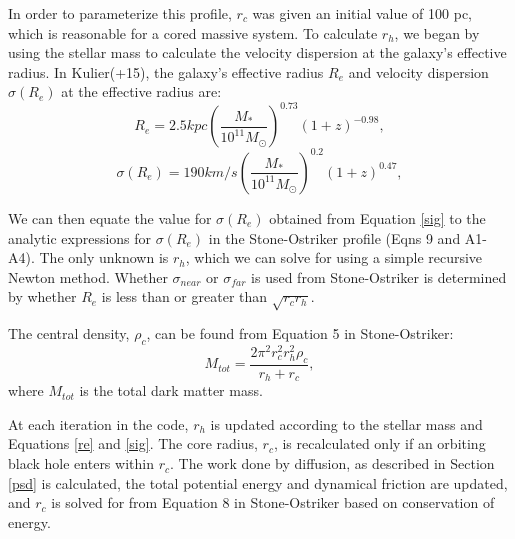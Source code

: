 \documentclass[english, backref,breaklinks,colorlinks,citecolor=blue, usenatbib]{mnras}
\begin{document}
In order to parameterize this profile, $r_c$ was given an initial value of 100 pc, which is reasonable for a cored massive system.  To calculate $r_h$, we began by using the stellar mass to calculate the velocity dispersion at the galaxy's effective radius.  In Kulier(+15), the galaxy's effective radius $R_{e}$ and velocity dispersion $\sigma(R_e)$ at the effective radius are:
\begin{equation} \label{re}
R_{e} = 2.5 kpc\left(\frac{M_*}{10^{11}M_{\odot}}\right)^{0.73}(1+z)^{-0.98},
\end{equation}
\begin{equation} \label{sig}
\sigma(R_{e}) = 190km/s\left(\frac{M_{*}}{10^{11}M_{\odot}}\right)^{0.2}(1+z)^{0.47},
\end{equation}

We can then equate the value for $\sigma({R_e})$ obtained from Equation \ref{sig} to the analytic expressions for $\sigma(R_{e})$ in the Stone-Ostriker profile (Eqns 9 and A1-A4).  The only unknown is $r_h$, which we can solve for using a simple recursive Newton method.  Whether $\sigma_{near}$ or $\sigma_{far}$ is used from Stone-Ostriker is determined by whether $R_e$ is less than or greater than $\sqrt{r_c r_h}$.

The central density, $\rho_c$, can be found from Equation 5 in Stone-Ostriker:
\begin{equation} \label{rhoc}
M_{tot} = \frac{2\pi^2r_{c}^2r_{h}^2\rho_c}{r_h+r_c},
\end{equation}
where $M_{tot}$ is the total dark matter mass.

At each iteration in the code, $r_h$ is updated according to the stellar mass and Equations \ref{re} and \ref{sig}.  The core radius, $r_c$, is recalculated only if an orbiting black hole enters within $r_c$.  The work done by diffusion, as described in Section \ref{psd} is calculated, the total potential energy and dynamical friction are updated, and $r_c$ is solved for from Equation 8 in Stone-Ostriker based on conservation of energy.
\end{document}
